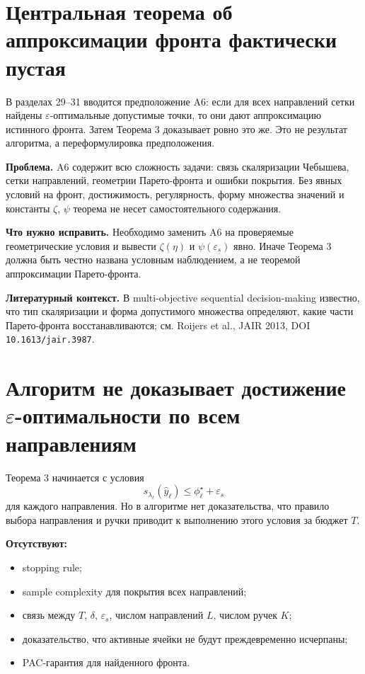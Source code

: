 \documentclass[11pt,a4paper]{article}
\begin{document}
\section{Центральная теорема об аппроксимации фронта фактически пустая}

В разделах 29--31 вводится предположение A6: если для всех направлений сетки найдены $\varepsilon$-оптимальные допустимые точки, то они дают аппроксимацию истинного фронта. Затем Теорема 3 доказывает ровно это же. Это не результат алгоритма, а переформулировка предположения.

\textbf{Проблема.} A6 содержит всю сложность задачи: связь скаляризации Чебышева, сетки направлений, геометрии Парето-фронта и ошибки покрытия. Без явных условий на фронт, достижимость, регулярность, форму множества значений и константы $\zeta$, $\psi$ теорема не несет самостоятельного содержания.

\textbf{Что нужно исправить.} Необходимо заменить A6 на проверяемые геометрические условия и вывести $\zeta(\eta)$ и $\psi(\varepsilon_s)$ явно. Иначе Теорема 3 должна быть честно названа условным наблюдением, а не теоремой аппроксимации Парето-фронта.

\textbf{Литературный контекст.} В multi-objective sequential decision-making известно, что тип скаляризации и форма допустимого множества определяют, какие части Парето-фронта восстанавливаются; см. Roijers et al., JAIR 2013, DOI \texttt{10.1613/jair.3987}.

\section{Алгоритм не доказывает достижение $\varepsilon$-оптимальности по всем направлениям}

Теорема 3 начинается с условия
\[
 s_{\lambda_\ell}(\hat y_\ell) \le \phi_\ell^\star + \varepsilon_s
\]
для каждого направления. Но в алгоритме нет доказательства, что правило выбора направления и ручки приводит к выполнению этого условия за бюджет $T$.

\textbf{Отсутствуют:}
\begin{itemize}
    \item stopping rule;
    \item sample complexity для покрытия всех направлений;
    \item связь между $T$, $\delta$, $\varepsilon_s$, числом направлений $L$, числом ручек $K$;
    \item доказательство, что активные ячейки не будут преждевременно исчерпаны;
    \item PAC-гарантия для найденного фронта.
\end{itemize}
\end{document}
